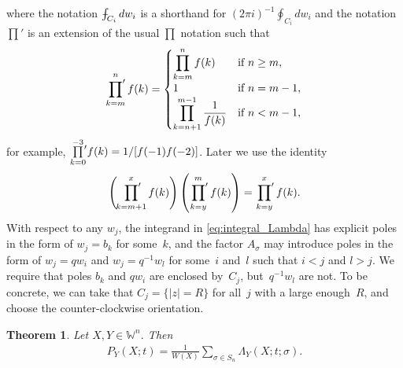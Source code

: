 \documentclass[pdftex]{sigma}
\numberwithin{equation}{section}
\newtheorem{Theorem}{Theorem}[section]
\def\Xint#1{\mathchoice
{\XXint\displaystyle\textstyle{#1}}%
{\XXint\textstyle\scriptstyle{#1}}%
{\XXint\scriptstyle\scriptscriptstyle{#1}}%
{\XXint\scriptscriptstyle\scriptscriptstyle{#1}}%
\!\int}
\def\XXint#1#2#3{{\setbox0=\hbox{$#1{#2#3}{\int}$}
\vcenter{\hbox{$#2#3$}}\kern-.5\wd0}}
\def\dashint{\Xint-}
\newcommand{\prodprime}{\sideset{}{'}\prod}
\newcommand{\Weylchamber}{\mathbb{W}}
\begin{document}
where the notation $\dashint_{C_i} dw_i$ is a shorthand for $(2\pi i)^{-1} \oint_{C_i} dw_i$ and the notation $\prod'$ is an extension of the usual $\prod$ notation such that
\begin{gather*}
 \prodprime^n_{k = m} f(k) =
 \begin{cases}
 \displaystyle \prod^n_{k = m} f(k) & \text{if $n \geq m$}, \\
 1 & \text{if $n = m - 1$}, \\
\displaystyle \prod^{m - 1}_{k = n + 1} \frac{1}{f(k)} & \text{if $n < m - 1$},
 \end{cases}
\end{gather*}
for example, %
 $\prod\limits^{-3}_{k = 0}\!\!{\vphantom{\prod}}' f(k) = 1/[f(-1) f(-2)]$. Later we use the identity
\begin{gather*}
 \left( \prodprime^x_{k = m + 1} f(k) \right) \left( \prodprime^m_{k = y} f(k) \right) = \prodprime^x_{k = y} f(k).
\end{gather*}
With respect to any $w_j$, the integrand in \eqref{eq:integral_Lambda} has explicit poles in the form of $w_j = b_k$ for some~$k$, and the factor $A_{\sigma}$ may introduce poles in the form of $w_j = q w_i$ and $w_j = q^{-1} w_l$ for some~$i$ and~$l$ such that $i < j$ and $l > j$. We require that poles $b_k$ and $q w_i$ are enclosed by~$C_j$, but~$q^{-1} w_l$ are not. To be concrete, we can take that $C_j = \{ \lvert z \rvert = R \}$ for all~$j$ with a large enough~$R$, and choose the counter-clockwise orientation.
\begin{Theorem} \label{thm:main}
 Let $X, Y \in \Weylchamber^n$. Then
 \begin{gather} \label{eq:main_result}
 P_Y(X; t) = \frac{1}{W(X)} \sum_{\sigma \in S_n} \Lambda_Y(X; t; \sigma).
 \end{gather}
\end{Theorem}
\end{document}
